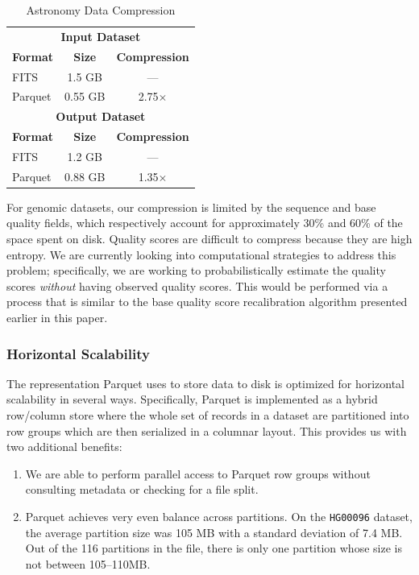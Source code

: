 \documentclass[10pt]{report} %
\begin{document}
\begin{table}[h]
\caption{Astronomy Data Compression}
\label{tab:astro-compression}
\begin{center}
\begin{tabular}{ l c c }
\hline
\multicolumn{3}{c}{\bf Input Dataset} \\
\bf Format & \bf Size & \bf Compression \\
\hline
\hline
FITS & 1.5 GB & --- \\
Parquet & 0.55 GB & 2.75$\times$ \\
\hline
\multicolumn{3}{c}{\bf Output Dataset} \\
\bf Format & \bf Size & \bf Compression \\
\hline
\hline
FITS & 1.2 GB & --- \\
Parquet & 0.88 GB & 1.35$\times$ \\
\hline
\end{tabular}
\end{center}
\end{table}

For genomic datasets, our compression is limited by the sequence and base quality fields, which respectively
account for approximately 30\% and 60\% of the space spent on disk. Quality scores are difficult to compress
because they are high entropy. We are currently looking into computational strategies to address this problem;
specifically, we are working to probabilistically estimate the quality scores \emph{without} having observed quality
scores. This would be performed via a process that is similar to the base quality score recalibration algorithm
presented earlier in this paper.

\subsubsection{Horizontal Scalability}
\label{sec:horizontal-scalability}

The representation Parquet uses to store data to disk is optimized for horizontal scalability in several ways.
Specifically, Parquet is implemented as a hybrid row/column store where the whole set of records in a dataset
are partitioned into row groups which are then serialized in a columnar layout. This provides us with two additional
benefits:

\begin{enumerate}
\item We are able to perform parallel access to Parquet row groups without consulting metadata or checking for
a file split.
\item Parquet achieves very even balance across partitions. On the \texttt{HG00096} dataset, the average
partition size was 105 MB with a standard deviation of 7.4 MB. Out of the 116 partitions in the file, there is only
one partition whose size is not between 105--110MB.
\end{enumerate}
\end{document}
